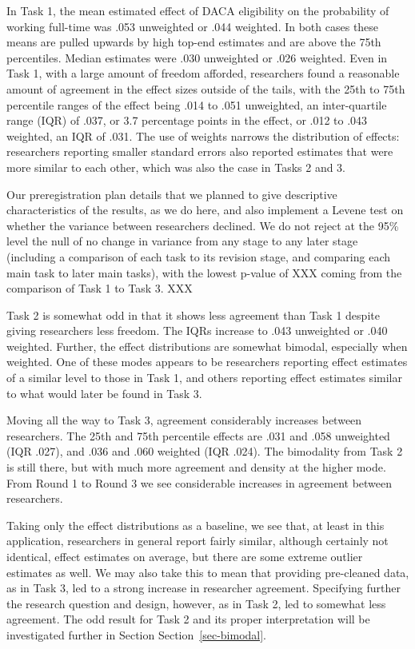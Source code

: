 \documentclass[
  letterpaper,
  DIV=11,
  numbers=noendperiod]{scrartcl}
\begin{document}
In Task 1, the mean estimated effect of DACA eligibility on the
probability of working full-time was .053 unweighted or .044 weighted.
In both cases these means are pulled upwards by high top-end estimates
and are above the 75th percentiles. Median estimates were .030
unweighted or .026 weighted. Even in Task 1, with a large amount of
freedom afforded, researchers found a reasonable amount of agreement in
the effect sizes outside of the tails, with the 25th to 75th percentile
ranges of the effect being .014 to .051 unweighted, an inter-quartile
range (IQR) of .037, or 3.7 percentage points in the effect, or .012 to
.043 weighted, an IQR of .031. The use of weights narrows the
distribution of effects: researchers reporting smaller standard errors
also reported estimates that were more similar to each other, which was
also the case in Tasks 2 and 3.

Our preregistration plan details that we planned to give descriptive
characteristics of the results, as we do here, and also implement a
Levene test on whether the variance between researchers declined. We do
not reject at the 95\% level the null of no change in variance from any
stage to any later stage (including a comparison of each task to its
revision stage, and comparing each main task to later main tasks), with
the lowest p-value of XXX coming from the comparison of Task 1 to Task
3. XXX

Task 2 is somewhat odd in that it shows less agreement than Task 1
despite giving researchers less freedom. The IQRs increase to .043
unweighted or .040 weighted. Further, the effect distributions are
somewhat bimodal, especially when weighted. One of these modes appears
to be researchers reporting effect estimates of a similar level to those
in Task 1, and others reporting effect estimates similar to what would
later be found in Task 3.

Moving all the way to Task 3, agreement considerably increases between
researchers. The 25th and 75th percentile effects are .031 and .058
unweighted (IQR .027), and .036 and .060 weighted (IQR .024). The
bimodality from Task 2 is still there, but with much more agreement and
density at the higher mode. From Round 1 to Round 3 we see considerable
increases in agreement between researchers.

Taking only the effect distributions as a baseline, we see that, at
least in this application, researchers in general report fairly similar,
although certainly not identical, effect estimates on average, but there
are some extreme outlier estimates as well. We may also take this to
mean that providing pre-cleaned data, as in Task 3, led to a strong
increase in researcher agreement. Specifying further the research
question and design, however, as in Task 2, led to somewhat less
agreement. The odd result for Task 2 and its proper interpretation will
be investigated further in Section Section~\ref{sec-bimodal}.
\end{document}
